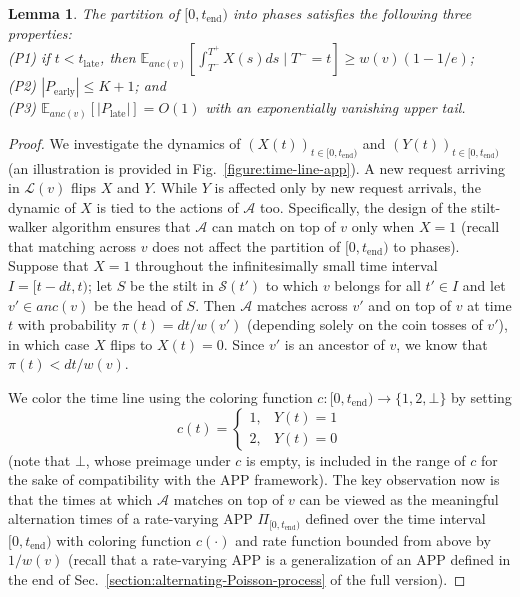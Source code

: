 \documentclass[11pt]{article}
\def\LongVersion{}
\newtheorem{lemma}[theorem]{Lemma}
\theoremstyle{definition}
\theoremstyle{plain}
\newtheorem{lemma}[theorem]{Lemma}
\theoremstyle{definition}
\theoremstyle{plain}
\newtheorem{lemma}{Lemma}[section]
\theoremstyle{definition}
\theoremstyle{plain}
\newcommand{\Sect}{Sec.}
\newcommand{\Fig}{Fig.}
\newcommand{\Expect}{\mathbb{E}}
\newcommand{\Leaves}{\mathcal{L}}
\newcommand{\Ancestors}{\mathit{anc}}
\newcommand{\EndTime}{\mathit{t}_{\mathrm{end}}}
\newcommand{\LateTime}{\mathit{t}_{\mathrm{late}}}
\newcommand{\Stilts}{\mathcal{S}}
\newcommand{\A}{\mathcal{A}}
\begin{document}
\begin{lemma} \label{lemma:partition-time-line-into-phases}
The partition of $[0, \EndTime)$ into phases satisfies the following three
properties: \\
(P1)
if
$t < \LateTime$,
then
$\Expect_{\Ancestors(v)} \left[ \int_{T^{-}}^{T^{+}} X(s) d s \mid T^{-} = t
\right]
\geq
w(v) (1 - 1 / e)$; \\
(P2)
$|P_{\mathrm{early}}| \leq K + 1$; and \\
(P3)
$\Expect_{\Ancestors(v)}[|P_{\mathrm{late}}|] = O (1)$
with an exponentially vanishing upper tail.
\end{lemma}
%
\LongVersion %
\begin{proof}
We investigate the dynamics of
$(X(t))_{t \in [0, \EndTime)}$
and
$(Y(t))_{t \in [0, \EndTime)}$
(an illustration is provided in \Fig{}~\ref{figure:time-line-app}).
A new request arriving in $\Leaves(v)$ flips $X$ and $Y$.
While $Y$ is affected only by new request arrivals, the dynamic of $X$ is tied
to the actions of $\A$ too.
Specifically, the design of the stilt-walker algorithm ensures that $\A$ can
match on top of $v$ only when $X = 1$ (recall that matching across $v$ does
not affect the partition of $[0, \EndTime)$ to phases).
Suppose that $X = 1$ throughout the infinitesimally small time
interval
$I = [t - d t, t)$;
let $S$ be the stilt in $\Stilts(t')$ to which $v$ belongs for all $t' \in I$
and let
$v' \in \Ancestors(v)$
be the head of $S$.
Then $\A$ matches across $v'$ and on top of $v$ at time $t$ with probability
$\pi(t) = d t / w(v')$
(depending solely on the coin tosses of $v'$), in which case $X$ flips to
$X(t) = 0$.
Since $v'$ is an ancestor of $v$, we know that
$\pi(t) < d t / w(v)$.

We color the time line using the coloring function
$c : [0, \EndTime) \rightarrow \{ 1, 2, \bot \}$
by setting
\[
c(t)
=
\left\{
\begin{array}{ll}
1, & Y(t) = 1 \\
2, & Y(t) = 0
\end{array}
\right.
\]
(note that $\bot$, whose preimage under $c$ is empty, is included in the range
of $c$ for the sake of compatibility with the APP framework).
The key observation now is that the times at which $\A$ matches on top of $v$
can be viewed as the meaningful alternation times of a rate-varying APP
$\Pi_{[0, \EndTime)}$ defined over the time interval $[0, \EndTime)$ with
coloring function $c(\cdot)$ and rate function bounded from above by $1 /
w(v)$ (recall that a rate-varying APP is a generalization of an APP defined in
the end of \Sect{}~\ref{section:alternating-Poisson-process} of the full
version).


\end{proof}
\end{document}
